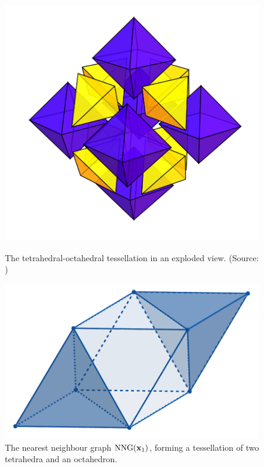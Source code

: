 \begin{figure}
  \centering
  \begin{minipage}{0.45\textwidth}
	  \centering
	  \includegraphics[width=1\textwidth]{../img/tetra-exploded.PNG}
	  \caption{The tetrahedral-octahedral tessellation in an exploded view. (Source: \cite{tess})}
	  \label{fig:explode}
  \end{minipage}\hfill
  \begin{minipage}{0.45\textwidth}
	  \centering
	  \includegraphics[width=1\textwidth]{../img/tetra-tess.png}
	  \caption{The nearest neighbour graph $\mathrm{NNG}({\mathbf{x}}_1)$, forming a tessellation of two tetrahedra and an octahedron.}
	  \label{fig:tetra-oct}
  \end{minipage}
\end{figure}

